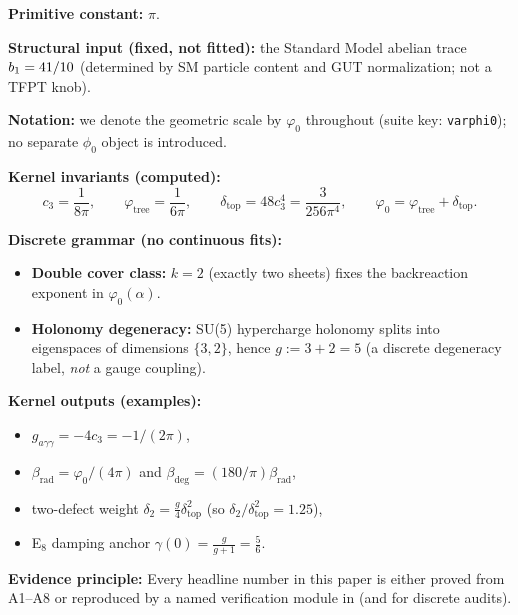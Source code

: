 \begin{tcolorbox}[colback=gray!4, colframe=gray!60, title={\textbf{Kernel specification (inputs $\to$ outputs)}}, fonttitle=\bfseries\small]
\textbf{Primitive constant:} $\pi$.

\textbf{Structural input (fixed, not fitted):} the Standard Model abelian trace $b_1=41/10$ (determined by SM particle content and GUT normalization; not a TFPT knob).

\textbf{Notation:} we denote the geometric scale by $\varphi_0$ throughout (suite key: \texttt{varphi0}); no separate $\phi_0$ object is introduced.

\textbf{Kernel invariants (computed):}
\[
c_3=\frac{1}{8\pi},\qquad 
\varphi_{\mathrm{tree}}=\frac{1}{6\pi},\qquad
\delta_{\mathrm{top}}=48c_3^4=\frac{3}{256\pi^4},\qquad
\varphi_0=\varphi_{\mathrm{tree}}+\delta_{\mathrm{top}}.
\]

\textbf{Discrete grammar (no continuous fits):}
\begin{itemize}[leftmargin=1.5em, topsep=2pt, itemsep=1pt]
    \item \textbf{Double cover class:} $k=2$ (exactly two sheets) fixes the backreaction exponent in $\varphi_0(\alpha)$.
    \item \textbf{Holonomy degeneracy:} SU(5) hypercharge holonomy splits into eigenspaces of dimensions $\{3,2\}$, hence $g:=3+2=5$ (a discrete degeneracy label, \emph{not} a gauge coupling).
\end{itemize}

\textbf{Kernel outputs (examples):}
\begin{itemize}[leftmargin=1.5em, topsep=2pt, itemsep=1pt]
    \item $g_{a\gamma\gamma}=-4c_3=-1/(2\pi)$,
    \item $\beta_{\mathrm{rad}}=\varphi_0/(4\pi)$ and $\beta_{\mathrm{deg}}=(180/\pi)\beta_{\mathrm{rad}}$,
    \item two-defect weight $\delta_2=\tfrac{g}{4}\delta_{\mathrm{top}}^2$ (so $\delta_2/\delta_{\mathrm{top}}^2=1.25$),
    \item E$_8$ damping anchor $\gamma(0)=\tfrac{g}{g+1}=\tfrac56$.
\end{itemize}

\textbf{Evidence principle:} Every headline number in this paper is either proved from A1--A8 or reproduced by a named verification module in  (and  for discrete audits).
\end{tcolorbox}

